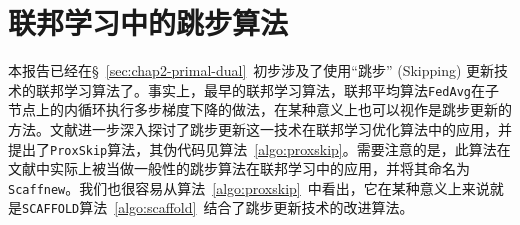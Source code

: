 \section{联邦学习中的跳步算法}
\label{sec:chap2-skip-alg}


本报告已经在\S~\ref{sec:chap2-primal-dual}~初步涉及了使用``跳步'' (Skipping) 更新技术的联邦学习算法了。事实上，最早的联邦学习算法，联邦平均算法\texttt{FedAvg}\cite{mcmahan2017fed_avg}在子节点上的内循环执行多步梯度下降的做法，在某种意义上也可以视作是跳步更新的方法。文献\cite{proxskip,proxskip-vr}进一步深入探讨了跳步更新这一技术在联邦学习优化算法中的应用，并提出了\texttt{ProxSkip}算法，其伪代码见算法~\ref{algo:proxskip}。需要注意的是，此算法在文献\parencite{proxskip}中实际上被当做一般性的跳步算法在联邦学习中的应用，并将其命名为\texttt{Scaffnew}。我们也很容易从算法~\ref{algo:proxskip}~中看出，它在某种意义上来说就是\texttt{SCAFFOLD}算法~\ref{algo:scaffold}~结合了跳步更新技术的改进算法。



